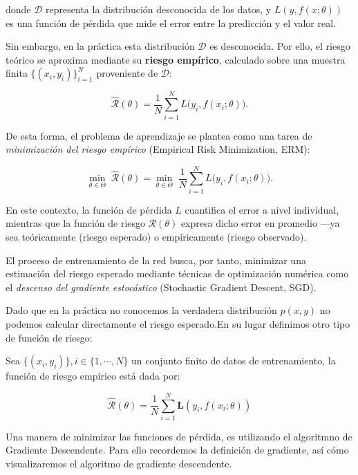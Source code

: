 donde $\mathcal{D}$ representa la distribución desconocida de los datos, y $L(y, f(x; \theta))$ es una función de pérdida que mide el error entre la predicción y el valor real.

Sin embargo, en la práctica esta distribución $\mathcal{D}$ es desconocida. Por ello, el riesgo teórico se aproxima mediante su \textbf{riesgo empírico}, calculado sobre una muestra finita $\{(x_i, y_i)\}_{i=1}^N$ proveniente de $\mathcal{D}$:

\begin{equation}
    \widehat{\mathcal{R}}(\theta) = \frac{1}{N} \sum_{i=1}^N L\bigl(y_i, f(x_i; \theta)\bigr).
\end{equation}

De esta forma, el problema de aprendizaje se plantea como una tarea de \textit{minimización del riesgo empírico} (Empirical Risk Minimization, ERM):

\begin{equation}
    \min_{\theta \in \Theta} \; \widehat{\mathcal{R}}(\theta)
    = \min_{\theta \in \Theta} \; \frac{1}{N} \sum_{i=1}^N L\bigl(y_i, f(x_i; \theta)\bigr).
\end{equation}

En este contexto, la función de pérdida $L$ cuantifica el error a nivel individual, mientras que la función de riesgo $\mathcal{R}(\theta)$ expresa dicho error en promedio —ya sea teóricamente (riesgo esperado) o empíricamente (riesgo observado).

El proceso de entrenamiento de la red busca, por tanto, minimizar una estimación del riesgo esperado mediante técnicas de optimización numérica como el \textit{descenso del gradiente estocástico} (Stochastic Gradient Descent, SGD).

Dado que en la práctica no conocemos la verdadera distribución $p(x,y)$ no podemos calcular directamente el riesgo esperado.En su lugar definimos otro tipo de función de riesgo:

\begin{definition}
    Sea $\{(x_i,y_i)\}, i \in\{1,\cdots,N\}$ un conjunto finito de datos de entrenamiento, la función de riesgo empírico está dada por:

    \[
        \hat{\mathcal{R}}(\theta) = \frac{1}{N} \sum_{i=1}^{N} \mathbf{L} ( y_i,f(x_i;\theta)
        )
    \]
\end{definition}
Una manera de minimizar las funciones de pérdida, es utilizando el algoritmno de Gradiente Descendente. Para ello recordemos la definición de gradiente, así cómo visualizaremos el algoritmo de gradiente descendente.

